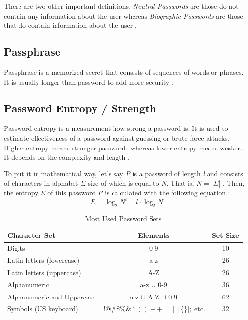 \documentclass[acmsmall,nonacm]{acmart}
\begin{document}
There are two other important definitions. \emph{Neutral Passwords} are those do not contain any information about the user whereas \emph{Biographic Passwords} are those that do contain information about the user \cite{Kavrestad_2019}.

\subsection{Passphrase} \label{passphrase}

Passphrase is a memorized secret that consists of sequences of words or phrases. It is usually longer than password to add more security \cite{passphrase_def}.

\subsection{Password Entropy / Strength} \label{entropy}
Password entropy is a measurement how strong a password is. It is used to estimate effectiveness of a password against guessing or brute-force attacks. Higher entropy means stronger passwords whereas lower entropy means weaker. It depends on the complexity and length \cite{hu_2018}.

To put it in mathematical way, let's say \emph{P} is a password of length \emph{l} and consists of characters in alphabet $\Sigma$ size of which is equal to \emph{N}. That is, \emph{N} = |$\Sigma$| . Then, the entropy \emph{E} of this password \emph{P} is calculated with the following equation :
\begin{equation} \label{eq:1}
E = \log_2 N^l = l \cdot \log_2 N
\end{equation}

\begin{center}
\begin{table}[ht!]

 \begin{tabular}[c]{| l  c  c |} 
\hline 
 Character Set & Elements & Set Size \\
 \hline\hline
 Digits & 0-9 & 10  \\ 
 \hline
 Latin letters (lowercase) & a-z & 26 \\
 \hline
 Latin letters (uppercase) & A-Z & 26  \\
 \hline
 Alphanumeric & a-z $\cup$  0-9 & 36  \\
 \hline
 Alphanumeric and Uppercase & a-z $\cup$ A-Z $\cup$ 0-9 & 62 \\  
 \hline
 Symbols (US keyboard) & $~!@\#\$\%\&*()-+=[]\{\}|;$ etc. & 32  \\
 \hline
 \end{tabular}
 \caption{Most Used Password Sets}
 \label{tab:sets}
\end{table}
\end{center}
\end{document}
